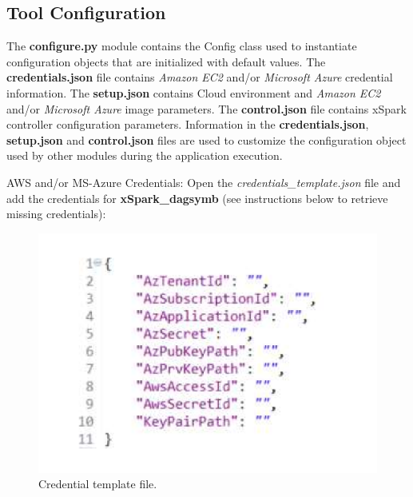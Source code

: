 \hypertarget{tool-configuration}{%
\subsection{Tool Configuration}\label{tool-configuration}}

The \textbf{configure.py} module contains the Config class used to
instantiate configuration objects that are initialized with default
values. The \textbf{credentials.json} file contains \emph{Amazon EC2}
and/or \emph{Microsoft Azure} credential information. The
\textbf{setup.json} contains Cloud environment and \emph{Amazon EC2}
and/or \emph{Microsoft Azure} image parameters. The
\textbf{control.json} file contains xSpark controller configuration
parameters. Information in the \textbf{credentials.json},
\textbf{setup.json} and \textbf{control.json} files are used to
customize the configuration object used by other modules during the
application execution.

AWS and/or MS-Azure Credentials: Open the
\emph{credentials\_template.json} file and add the credentials for \textbf{xSpark\_dagsymb} (see instructions below to retrieve missing
credentials):
\begin{figure}[thbp]
	\centering
	\includegraphics[width=\columnwidth]{images/xspark_dagsymb_credentials_template.pdf}
	\caption{Credential template file.}
	\label{fig:xspark_dagsymb_credentials_template}
\end{figure}

